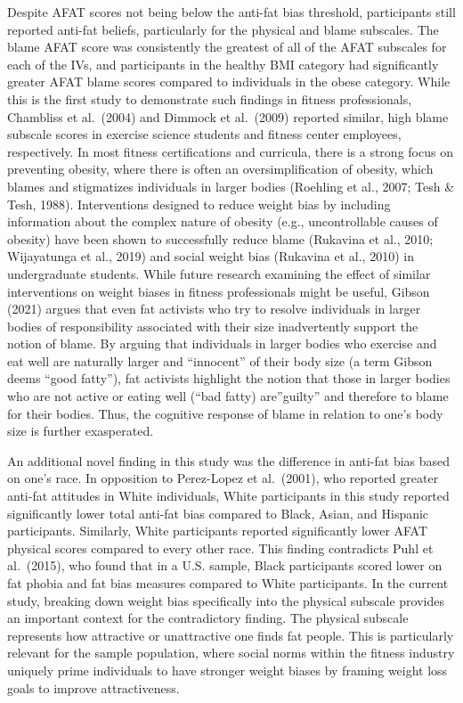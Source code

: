 \documentclass[
  jou,
  longtable,
  nolmodern,
  notxfonts,
  notimes,
  colorlinks=true,linkcolor=blue,citecolor=blue,urlcolor=blue]{apa7}
\begin{document}
Despite AFAT scores not being below the anti-fat bias threshold,
participants still reported anti-fat beliefs, particularly for the
physical and blame subscales. The blame AFAT score was consistently the
greatest of all of the AFAT subscales for each of the IVs, and
participants in the healthy BMI category had significantly greater AFAT
blame scores compared to individuals in the obese category. While this
is the first study to demonstrate such findings in fitness
professionals, Chambliss et al.~(2004) and Dimmock et al.~(2009)
reported similar, high blame subscale scores in exercise science
students and fitness center employees, respectively. In most fitness
certifications and curricula, there is a strong focus on preventing
obesity, where there is often an oversimplification of obesity, which
blames and stigmatizes individuals in larger bodies (Roehling et al.,
2007; Tesh \& Tesh, 1988). Interventions designed to reduce weight bias
by including information about the complex nature of obesity (e.g.,
uncontrollable causes of obesity) have been shown to successfully reduce
blame (Rukavina et al., 2010; Wijayatunga et al., 2019) and social
weight bias (Rukavina et al., 2010) in undergraduate students. While
future research examining the effect of similar interventions on weight
biases in fitness professionals might be useful, Gibson (2021) argues
that even fat activists who try to resolve individuals in larger bodies
of responsibility associated with their size inadvertently support the
notion of blame. By arguing that individuals in larger bodies who
exercise and eat well are naturally larger and ``innocent'' of their
body size (a term Gibson deems ``good fatty''), fat activists highlight
the notion that those in larger bodies who are not active or eating well
(``bad fatty) are''guilty'' and therefore to blame for their bodies.
Thus, the cognitive response of blame in relation to one's body size is
further exasperated.

An additional novel finding in this study was the difference in anti-fat
bias based on one's race. In opposition to Perez-Lopez et al.~(2001),
who reported greater anti-fat attitudes in White individuals, White
participants in this study reported significantly lower total anti-fat
bias compared to Black, Asian, and Hispanic participants. Similarly,
White participants reported significantly lower AFAT physical scores
compared to every other race. This finding contradicts Puhl et
al.~(2015), who found that in a U.S. sample, Black participants scored
lower on fat phobia and fat bias measures compared to White
participants. In the current study, breaking down weight bias
specifically into the physical subscale provides an important context
for the contradictory finding. The physical subscale represents how
attractive or unattractive one finds fat people. This is particularly
relevant for the sample population, where social norms within the
fitness industry uniquely prime individuals to have stronger weight
biases by framing weight loss goals to improve attractiveness.
\end{document}
